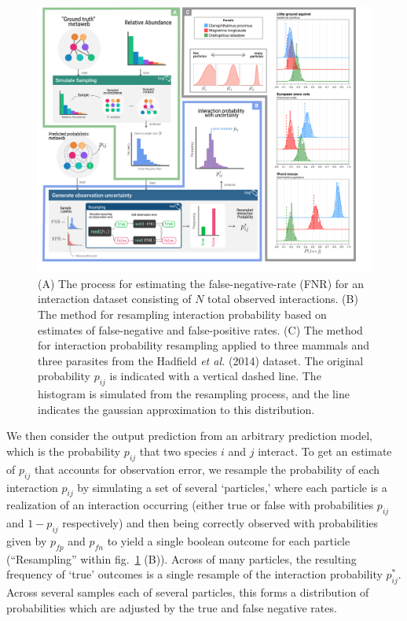 \documentclass[11pt]{article}
\makeatletter
\def\maxwidth{\ifdim\Gin@nat@width>\linewidth\linewidth
\else\Gin@nat@width\fi}
\let\Oldincludegraphics\includegraphics
\renewcommand{\includegraphics}[1]{\Oldincludegraphics[width=\maxwidth]{#1}}
\makeatother
\begin{document}
\begin{figure}
\hypertarget{fig:resampling_concept}{%
\centering
\includegraphics{./figures/uncertainty_sampler.png}
\caption{(A) The process for estimating the false-negative-rate (FNR)
for an interaction dataset consisting of \(N\) total observed
interactions. (B) The method for resampling interaction probability
based on estimates of false-negative and false-positive rates. (C) The
method for interaction probability resampling applied to three mammals
and three parasites from the Hadfield \emph{et al.} (2014) dataset. The
original probability \(p_{ij}\) is indicated with a vertical dashed
line. The histogram is simulated from the resampling process, and the
line indicates the gaussian approximation to this
distribution.}\label{fig:resampling_concept}
}
\end{figure}

We then consider the output prediction from an arbitrary prediction
model, which is the probability \(p_{ij}\) that two species \(i\) and
\(j\) interact. To get an estimate of \(p_{ij}\) that accounts for
observation error, we resample the probability of each interaction
\(p_{ij}\) by simulating a set of several `particles,' where each
particle is a realization of an interaction occurring (either true or
false with probabilities \(p_{ij}\) and \(1-p_{ij}\) respectively) and
then being correctly observed with probabilities given by \(p_{fp}\) and
\(p_{fn}\) to yield a single boolean outcome for each particle
(``Resampling'' within fig.~\ref{fig:resampling_concept} (B)). Across of
many particles, the resulting frequency of `true' outcomes is a single
resample of the interaction probability \(p_{ij}^*\). Across several
samples each of several particles, this forms a distribution of
probabilities which are adjusted by the true and false negative rates.
\end{document}

